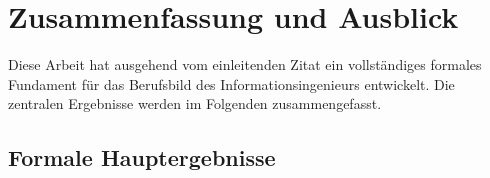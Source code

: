 ﻿\documentclass[a4paper,12pt]{report}
\theoremstyle{definition}
\begin{document}

\chapter{Zusammenfassung und Ausblick}
\label{sec:zusammenfassung}

Diese Arbeit hat ausgehend vom einleitenden Zitat ein vollständiges formales
Fundament für das Berufsbild des Informationsingenieurs entwickelt.
Die zentralen Ergebnisse werden im Folgenden zusammengefasst.

\section{Formale Hauptergebnisse}
\end{document}
